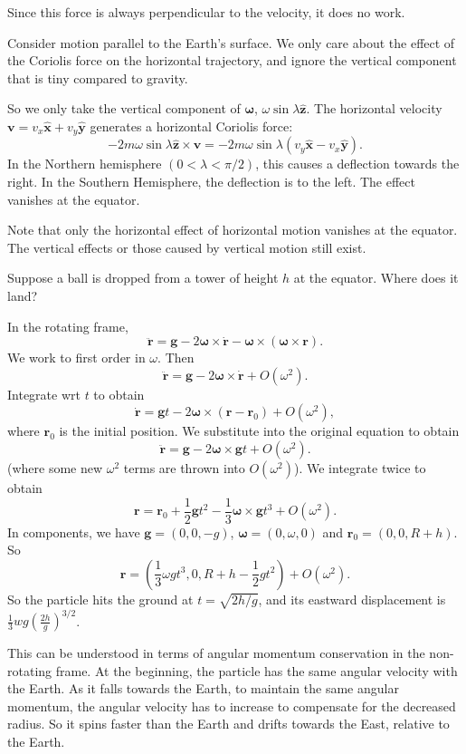 \documentclass[a4paper]{article}
\begin{document}
Since this force is always perpendicular to the velocity, it does no work.

Consider motion parallel to the Earth's surface. We only care about the effect of the Coriolis force on the horizontal trajectory, and ignore the vertical component that is tiny compared to gravity.

So we only take the vertical component of $\boldsymbol\omega$, $\omega\sin\lambda\hat{\mathbf{z}}$. The horizontal velocity $\mathbf{v} = v_x \hat{\mathbf{x}} + v_y \hat{\mathbf{y}}$ generates a horizontal Coriolis force:
\[
  -2m\omega\sin\lambda\hat{\mathbf{z}}\times \mathbf{v} = -2m\omega\sin\lambda(v_y \hat{\mathbf{x}} - v_x \hat{\mathbf{y}}).
\]
In the Northern hemisphere $(0 < \lambda < \pi/2)$, this causes a deflection towards the right. In the Southern Hemisphere, the deflection is to the left. The effect vanishes at the equator.

Note that only the horizontal effect of horizontal motion vanishes at the equator. The vertical effects or those caused by vertical motion still exist.

\begin{eg}
  Suppose a ball is dropped from a tower of height $h$ at the equator. Where does it land?

  In the rotating frame,
  \[
    \ddot{\mathbf{r}} = \mathbf{g} - 2\boldsymbol\omega\times \dot{\mathbf{r}} - \boldsymbol\omega\times(\boldsymbol\omega\times \mathbf{r}).
  \]
  We work to first order in $\omega$. Then
  \[
    \ddot{\mathbf{r}} = \mathbf{g} - 2\boldsymbol\omega\times \dot{\mathbf{r}} + O(\omega^2).
  \]
  Integrate wrt $t$ to obtain
  \[
    \dot{\mathbf{r}} = \mathbf{g}t - 2\boldsymbol\omega \times (\mathbf{r} - \mathbf{r}_0) + O(\omega^2),
  \]
  where $\mathbf{r}_0$ is the initial position. We substitute into the original equation to obtain
  \[
    \ddot{\mathbf{r}} = \mathbf{g} - 2\boldsymbol\omega\times \mathbf{g}t + O(\omega^2).
  \]
  (where some new $\omega^2$ terms are thrown into $O(\omega^2)$). We integrate twice to obtain
  \[
    \mathbf{r} = \mathbf{r}_0 + \frac{1}{2}\mathbf{g}t^2 - \frac{1}{3}\boldsymbol\omega \times \mathbf{g}t^3 + O(\omega^2).
  \]
  In components, we have $\mathbf{g} = (0, 0, -g)$, $\boldsymbol\omega = (0, \omega, 0)$ and $\mathbf{r}_0 = (0, 0, R + h)$. So
  \[
    \mathbf{r} = \left(\frac{1}{3}\omega gt^3, 0, R + h - \frac{1}{2}gt^2\right) + O(\omega^2).
  \]
  So the particle hits the ground at $t = \sqrt{2h/g}$, and its eastward displacement is $\frac{1}{3}wg\left(\frac{2h}{g}\right)^{3/2}$.

  This can be understood in terms of angular momentum conservation in the non-rotating frame. At the beginning, the particle has the same angular velocity with the Earth. As it falls towards the Earth, to maintain the same angular momentum, the angular velocity has to increase to compensate for the decreased radius. So it spins faster than the Earth and drifts towards the East, relative to the Earth.
\end{eg}
\end{document}

